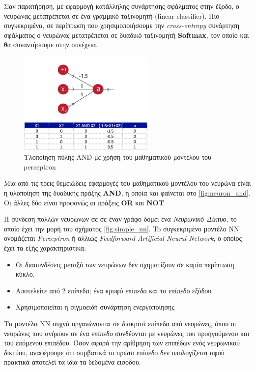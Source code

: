 Σαν παρατήρηση, με εφαρμογή κατάλληλης
συνάρτησης σφάλματος στην έξοδο, ο νευρώνας μετατρέπεται σε ένα  γραμμικό ταξινομητή
(linear classifier). Πιο συγκεκριμένα, σε περίπτωση που χρησιμοποιήσουμε την \emph{cross-entropy}
συνάρτηση σφάλματος ο νευρώνας μετατρέπεται σε δυαδικό ταξινομητή \textbf{Softmax},
τον οποίο και θα συναντήσουμε στην συνέχεια.

\begin{figure}[!ht]
  \centering
  \includegraphics[width=0.6\textwidth]{./images/chapter3/perceptron_and.jpg}
  \caption[Υλοποίηση πύλης AND με χρήση του μαθηματικού μοντέλου του perceptron]{Υλοποίηση πύλης AND με χρήση του μαθηματικού μοντέλου του perceptron}
  \label{fig:neuron_and}
\end{figure}

Μία από τις τρεις θεμείώδεις εφαρμογές του μαθηματικού μοντέλου του νευρώνα είναι η υλοποίηση της
δυαδικής πράξης \textbf{AND}, η οποία και φαίνεται στο \autoref{fig:neuron_and}.
Οι άλλες δύο είναι προφανώς οι πράξεις \textbf{OR} και \textbf{NOT}.

H σύνδεση πολλών νευρώνων σε σε έναν γράφο δομεί ένα \emph{Νευρωνικό Δίκτυο},
το οποίο έχει την μορή του σχήματος \autoref{fig:simple_nn}.
To συγκεκριμένο μοντέλο ΝΝ ονομάζεται \emph{Perceptron} ή αλλιώς
\emph{Feedforward Artificial Neural Network}, ο οποίος έχει τα εξής χαρακτηριστικα:
\begin{itemize}
  \item{Οι διασυνδέσεις μεταξύ των νευρώνων δεν σχηματίζουν σε καμία περίπτωση κύκλο.}
  \item{Αποτελείτε από 2 επίπεδα; ένα κρυφό επίπεδο και το επίπεδο εξόδου}
  \item{Χρησιμοποιείται η σιγμοειδή συνάρτηση ενεργοποίησης}
\end{itemize}

Τα μοντέλα ΝΝ συχνά οργανώνονται σε διακριτά επίπεδα από νευρώνες, όπου οι
νευρώνες που ανήκουν σε ένα επίπεδο συνδέονται με νευρώνες του
προηγούμενου και του επόμενου επιπέδου. Όσον αφορά την αρίθμηση
των επιπέδων ενός νευρωνικού δικτύου, αναφέρουμε ότι συμβατικά το πρώτο επίπεδο
δεν υπολογίζεται αφού πρακτικά αποτελεί τα ίδια τα δεδομένα εισόδου.

